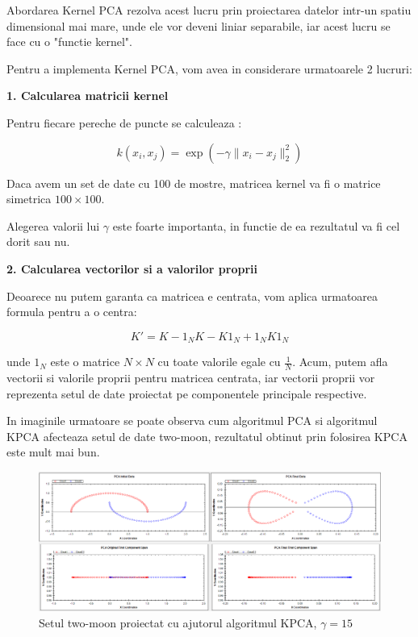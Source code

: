 \documentclass[12pt]{article}
\begin{document}
Abordarea Kernel PCA rezolva acest lucru prin proiectarea datelor intr-un spatiu dimensional mai mare, unde ele vor deveni liniar separabile, iar acest lucru se face cu o "functie kernel".

Pentru a implementa Kernel PCA, vom avea in considerare urmatoarele 2 lucruri:

\textbf{1. Calcularea matricii kernel} 

Pentru fiecare pereche de puncte se calculeaza :

\begin{equation}
k(x_i,x_j)=\exp(-\gamma \|x_i - x_j\|_2^2)
\end{equation}

Daca avem un set de date cu 100 de mostre, matricea kernel va fi o matrice simetrica $100 \times 100$.

Alegerea valorii lui $\gamma$ este foarte importanta, in functie de ea rezultatul va fi cel dorit sau nu.

\textbf{2. Calcularea vectorilor si a valorilor proprii}

Deoarece nu putem garanta ca matricea e centrata, vom aplica urmatoarea formula pentru a o centra: 

\begin{equation}
K'=K-1_NK-K1_N+1_NK1_N
\end{equation}

unde $1_N$ este o matrice $N \times N$ cu toate valorile egale cu $\frac{1}{N}$.
Acum, putem afla vectorii si valorile proprii pentru matricea centrata, iar vectorii proprii vor reprezenta setul de date proiectat pe componentele principale respective.

In imaginile urmatoare se poate observa cum algoritmul PCA si algoritmul KPCA afecteaza setul de date two-moon, rezultatul obtinut prin folosirea KPCA este mult mai bun. 


\begin{figure}[H]
\centering
\caption{Setul two-moon proiectat cu ajutorul algoritmul KPCA, $\gamma =15$}
\includegraphics[width=\linewidth]{twomoon1}
\end{figure}
\end{document}
